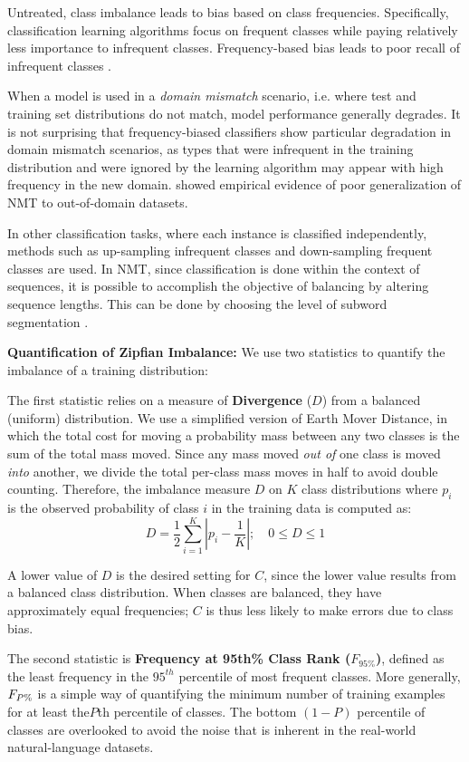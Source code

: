 Untreated, class imbalance leads to bias based on class frequencies.
Specifically, classification learning algorithms focus on frequent classes while paying relatively less importance to infrequent classes.
Frequency-based bias leads to poor recall of infrequent classes \cite{Johnson2019SurveyImbalance}. 

When a model is used in a \textit{domain mismatch} scenario, i.e. where test and training set distributions do not match, model performance generally degrades.
It is not surprising that frequency-biased classifiers show particular degradation in domain mismatch scenarios, as  types that were infrequent in the training distribution and were ignored by the learning algorithm may appear with high frequency in the new domain.
\citet{koehn2017sixchallenges} showed empirical evidence of poor generalization of NMT to out-of-domain datasets.

In other classification tasks, where each instance is classified independently, methods such as up-sampling infrequent classes and down-sampling frequent classes are used.
In NMT, since classification is done within the context of sequences, it is possible to accomplish the objective of balancing by altering sequence lengths.
This can be done by choosing the level of subword segmentation \cite{sennrich-etal-2016-bpe}.

\textbf{Quantification of Zipfian Imbalance:}
We use two statistics to quantify the imbalance of a training distribution:

The first statistic relies on a measure of \textbf{Divergence} ($D$) from a balanced (uniform) distribution. 
We use a simplified version of Earth Mover Distance, in which the total cost for moving a probability mass between any two classes  is the sum of the total mass moved.
Since any mass moved \textit{out of} one class is moved \textit{into} another, we divide the total per-class mass moves in half to avoid double counting.  
Therefore, the imbalance measure $D$ on $K$ class distributions where $p_i$ is the observed probability of class $i$ in the training data is computed as:
$$D = \frac{1}{2} \sum_{i=1}^{K}| p_i - \frac{1}{K}|; \quad 0 \le D \le 1 $$

A lower value of $D$ is the desired setting for $C$, since the lower value results from a balanced class distribution. 
When classes are balanced, they have approximately equal frequencies; $C$ is thus less likely to make errors due to class bias.

The second statistic is \textbf{Frequency at 95th\% Class Rank (\textbf{$F_{95\%}$})}, defined as the least frequency in the $95^{th}$ percentile of most frequent classes.
More generally, $F_{\large{P\%}}$ is a simple way of quantifying the minimum number of training examples for at least the$P$th percentile of classes.
The bottom $(1-P)$ percentile of classes are overlooked to avoid the noise that is inherent in the real-world natural-language datasets.

